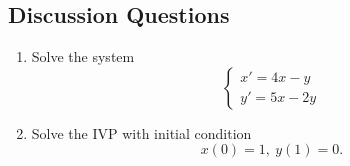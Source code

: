 \documentclass[12pt]{amsart}
\numberwithin{equation}{section}
\theoremstyle{plain} %
\theoremstyle{definition}
\theoremstyle{remark}
\begin{document}
\subsection*{Discussion Questions}
\begin{enumerate}
\item
Solve the system
\[ \begin{cases} x' = 4 x - y \\ y' = 5x - 2y\end{cases}\]
\item
Solve the IVP with initial condition
\[ x(0)=1, \ y(1)=0.\]
\end{enumerate}
\end{document}

